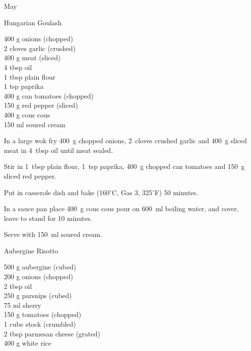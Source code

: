 \begin{menu}{May}
    \begin{recipe}{2}{Hungarian Goulash}%
		\begin{ingredients}
		400 g onions (chopped) \\
	2 cloves garlic (crushed) \\
	400 g meat (sliced) \\
	4 tbsp oil  \\
	1 tbsp plain flour  \\
	1 tsp paprika  \\
	400 g can tomatoes (chopped) \\
	150 g red pepper (sliced) \\
	400 g cous cous  \\
	150 ml soured cream  \\
	
		\end{ingredients}
	
	
    \begin{instructions}
    \item 
        In a large wok fry
        400~g chopped onions,
        2~cloves crushed garlic
        and
        400~g sliced meat
        in
        4~tbsp  oil
        until meat sealed.
      \item 
        Stir in
        1~tbsp  plain flour,
        1~tsp  paprika,
        400~g chopped can tomatoes
        and
        150~g sliced red pepper.
      \item 
        Put in casserole dish and bake (160$^{\circ}$C, Gas 3, 325$^{\circ}$F) 50 minutes.
      \item 
    In a
    sauce pan 
    place
    400~g  cous cous
    pour on
    600~ml  boiling water,
    and cover, leave to stand for 10 minutes.
  \item 
        Serve with
        150~ml  soured cream.
      
    \end{instructions}
    \end{recipe}%
  
    \begin{recipe}{2}{Aubergine Risotto}%
		\begin{ingredients}
		500 g aubergine (cubed) \\
	200 g onions (chopped) \\
	2 tbsp oil  \\
	250 g parsnips (cubed) \\
	75 ml sherry  \\
	150 g tomatoes (chopped) \\
	1 cube stock (crumbled) \\
	2 tbsp parmesan cheese (grated) \\
	400 g white rice  \\
	

\end{ingredients}
\end{recipe}
\end{menu}
